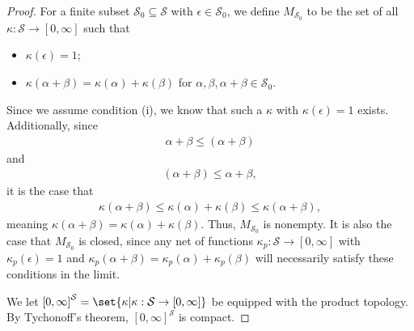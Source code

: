 \begin{proof}
  For a finite subset $\mathcal{S}_0 \subseteq \mathcal{S}$ with $\epsilon\in \mathcal{S}_0$, we define $M_{\mathcal{S}_0}$ to be the set of all $\kappa\colon \mathcal{S}\rightarrow [0,\infty]$ such that
  \begin{itemize}
    \item $\kappa\left(\epsilon\right) = 1$;
    \item $\kappa\left(\alpha + \beta\right) = \kappa\left(\alpha\right) + \kappa\left(\beta\right)$ for $\alpha,\beta,\alpha + \beta\in \mathcal{S}_0$.
  \end{itemize}
  Since we assume condition (i), we know that such a $\kappa$ with $\kappa\left(\epsilon\right) = 1$ exists. Additionally, since
  \begin{align*}
    \alpha + \beta \leq \left(\alpha + \beta\right)
  \end{align*}
  and
  \begin{align*}
    \left(\alpha + \beta\right) \leq \alpha + \beta,
  \end{align*}
  it is the case that
  \begin{align*}
    \kappa\left(\alpha + \beta\right) \leq \kappa\left(\alpha\right) + \kappa\left(\beta\right) \leq \kappa\left(\alpha + \beta\right),
  \end{align*}
  meaning $\kappa\left(\alpha + \beta\right) = \kappa\left(\alpha\right) + \kappa\left(\beta\right)$. Thus, $M_{\mathcal{S}_0}$ is nonempty. It is also the case that $M_{\mathcal{S}_0}$ is closed, since any net of functions $\kappa_{p}\colon \mathcal{S}\rightarrow [0,\infty]$ with $\kappa_{p}\left(\epsilon\right) = 1$ and $\kappa_{p}\left(\alpha + \beta\right) = \kappa_{p}\left(\alpha\right) + \kappa_{p}\left(\beta\right)$ will necessarily satisfy these conditions in the limit.\newline

  We let $\left[0,\infty\right]^{\mathcal{S}} = \set{\kappa| \kappa:\mathcal{S}\rightarrow [0,\infty]}$ be equipped with the product topology. By Tychonoff's theorem, $\left[0,\infty\right]^{\mathcal{S}}$ is compact.\newline


\end{proof}
